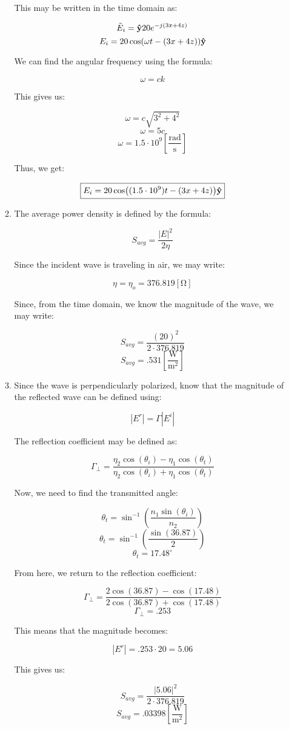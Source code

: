 \begin{enumerate}
\begin{enumerate}
        This may be written in the time domain as:

        $$\tilde{E}_i=\bold{\hat{y}}20e^{-j(3x+4z)}$$
        $$E_i=20\cos(\omega t-(3x+4z))\bold{\hat{y}}$$

        We can find the angular frequency using the formula:

        $$\omega=ck$$

        This gives us:

        $$\omega=c\sqrt{3^2+4^2}$$
        $$\omega=5c$$
        $$\omega=1.5\cdot10^{9}\left[ \frac{\text{rad}}{\si{\second}} \right]$$

        Thus, we get:

        $$\boxed{E_i=20\cos((1.5\cdot10^9) t-(3x+4z))\bold{\hat{y}}}$$

      \item 

        The average power density is defined by the formula:

        $$S_{avg}=\frac{|E|^2}{2\eta}$$

        Since the incident wave is traveling in air, we may write:

        $$\eta=\eta_o=376.819[\si{\ohm}]$$

        Since, from the time domain, we know the magnitude of the wave, we may write:

        $$S_{avg}=\frac{(20)^2}{2\cdot376.819}$$
        $$\boxed{S_{avg}=.531\left[ \frac{\si{\watt}}{\si{\meter\squared}} \right]}$$

      \item 

        Since the wave is perpendicularly polarized, know that the magnitude of the reflected wave can be defined using:

        $$|E^r|=\Gamma|E^i|$$

        The reflection coefficient may be defined as:

        $$\Gamma_{\perp}=\frac{\eta_2\cos(\theta_i)-\eta_1\cos(\theta_t)}{\eta_2\cos(\theta_i)+\eta_1\cos(\theta_t)}$$

        Now, we need to find the transmitted angle:

        $$\theta_t=\sin^{-1}\left( \frac{n_1\sin(\theta_i)}{n_2} \right)$$
        $$\theta_t=\sin^{-1}\left( \frac{\sin(36.87)}{2} \right)$$
        $$\theta_t=17.48^{\circ}$$

        From here, we return to the reflection coefficient:

        $$\Gamma_{\perp}=\frac{2\cos(36.87)-\cos(17.48)}{2\cos(36.87)+\cos(17.48)}$$
        $$\Gamma_{\perp}=.253$$

        This means that the magnitude becomes:

        $$|E^r|=.253\cdot20=5.06$$

        This gives us:

        $$S_{avg}=\frac{|5.06|^2}{2\cdot376.819}$$
        $$\boxed{S_{avg}=.03398\left[ \frac{\si{\watt}}{\si{\meter\squared}} \right]}$$

    \end{enumerate}

\end{enumerate}



